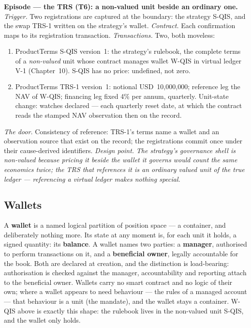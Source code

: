 \documentclass[11pt,a4paper]{article}
\newcommand{\USD}[1]{\mbox{USD~#1}}
\begin{document}
\medskip\noindent\textbf{Episode --- the TRS (T6): a non-valued unit beside an ordinary
one.}
\emph{Trigger.} Two registrations are captured at the boundary: the strategy S-QIS, and
the swap TRS-1 written on the strategy's wallet.
\emph{Contract.} Each confirmation maps to its registration transaction.
\emph{Transactions.} Two, both moveless:
\begin{enumerate}[nosep,leftmargin=2.2em]
\item ProductTerms S-QIS version~1: the strategy's rulebook, the complete terms of a
  \emph{non-valued} unit whose contract manages wallet W-QIS in virtual ledger V-1
  (Chapter~10). S-QIS has no price: undefined, not zero.
\item ProductTerms TRS-1 version~1: notional \USD{10{,}000{,}000}; reference leg the NAV
  of W-QIS; financing leg fixed 4\% per annum, quarterly. Unit-state change: watches
  declared --- each quarterly reset date, at which the contract reads the stamped NAV
  observation then on the record.
\end{enumerate}
\emph{The door.} Consistency of reference: TRS-1's terms name a wallet and an
observation source that exist on the record; the registrations commit once under their
cause-derived identifiers.
\emph{Design point.} \emph{The strategy's governance shell is non-valued because pricing
it beside the wallet it governs would count the same economics twice; the TRS that
references it is an ordinary valued unit of the true ledger --- referencing a virtual
ledger makes nothing special.}

\subsection{Wallets}

A \textbf{wallet} is a named logical partition of position space --- a container, and
deliberately nothing more. Its state at any moment is, for each unit it holds, a signed
quantity: its \textbf{balance}. A wallet names two parties: a \textbf{manager},
authorised to perform transactions on it, and a \textbf{beneficial owner}, legally
accountable for the book. Both are declared at creation, and the distinction is
load-bearing: authorisation is checked against the manager, accountability and reporting
attach to the beneficial owner. Wallets carry no smart contract and no logic of their
own; where a wallet appears to need behaviour --- the rules of a managed account ---
that behaviour is a unit (the mandate), and the wallet stays a container. W-QIS above is
exactly this shape: the rulebook lives in the non-valued unit S-QIS, and the wallet only
holds.
\end{document}
